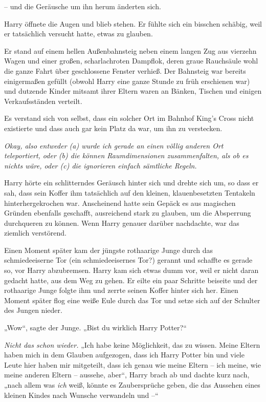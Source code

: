 {-- und die Geräusche um ihn herum änderten sich.

Harry öffnete die Augen und blieb stehen. Er fühlte sich ein bisschen schäbig, weil er tatsächlich versucht hatte, etwas zu glauben.

Er stand auf einem hellen Außenbahnsteig neben einem langen Zug aus vierzehn Wagen und einer großen, scharlachroten Dampflok, deren graue Rauchsäule wohl die ganze Fahrt über geschlossene Fenster verhieß. Der Bahnsteig war bereits einigermaßen gefüllt (obwohl Harry eine ganze Stunde zu früh erschienen war) und dutzende Kinder mitsamt ihrer Eltern waren an Bänken, Tischen und einigen Verkaufsständen verteilt.

Es verstand sich von selbst, dass ein solcher Ort im Bahnhof King's Cross nicht existierte und dass auch gar kein Platz da war, um ihn zu verstecken.

\emph{Okay, also entweder (a) wurde ich gerade an einen völlig anderen Ort teleportiert, oder (b) die können Raumdimensionen zusammenfalten, als ob es nichts wäre, oder (c) die ignorieren einfach sämtliche Regeln.}

Harry hörte ein schlitterndes Geräusch hinter sich und drehte sich um, so dass er sah, dass sein Koffer ihm tatsächlich auf den kleinen, klauenbesetzten Tentakeln hinterhergekrochen war. Anscheinend hatte sein Gepäck es aus magischen Gründen ebenfalls geschafft, ausreichend stark zu glauben, um die Absperrung durchqueren zu können. Wenn Harry genauer darüber nachdachte, war das ziemlich verstörend.

Einen Moment später kam der jüngste rothaarige Junge durch das schmiedeeiserne Tor (ein schmiedeeisernes Tor?) gerannt und schaffte es gerade so, vor Harry abzubremsen. Harry kam sich etwas dumm vor, weil er nicht daran gedacht hatte, aus dem Weg zu gehen. Er eilte ein paar Schritte beiseite und der rothaarige Junge folgte ihm und zerrte seinen Koffer hinter sich her. Einen Moment später flog eine weiße Eule durch das Tor und setze sich auf der Schulter des Jungen nieder.

„Wow“, sagte der Junge. „Bist du wirklich Harry Potter?“

\emph{Nicht das schon wieder.} „Ich habe keine Möglichkeit, das zu wissen. Meine Eltern haben mich in dem Glauben aufgezogen, dass ich Harry Potter bin und viele Leute hier haben mir mitgeteilt, dass ich genau wie meine Eltern -- ich meine, wie meine anderen Eltern -- aussehe, aber“, Harry brach ab und dachte kurz nach, „nach allem was \emph{ich} weiß, könnte es Zaubersprüche geben, die das Aussehen eines kleinen Kindes nach Wunsche verwandeln und --“

}
